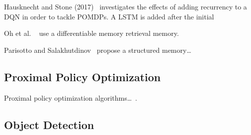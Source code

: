 
Hausknecht and Stone (2017)~\cite{hausknecht_stone_2017} investigates the effects of adding recurrency to a DQN in order to tackle POMDPs.
A LSTM is added after the initial 

Oh et al. ~\cite{oh_minecraft_2016} use a differentiable memory retrieval memory.

Parisotto and Salakhutdinov~\cite{parisotto_salakhutdinov_2017} propose a structured memory\dots %




\subsection{Proximal Policy Optimization}

Proximal policy optimization algorithms\dots~\cite{schulman_ppo_2017}.

\subsection{Object Detection}

